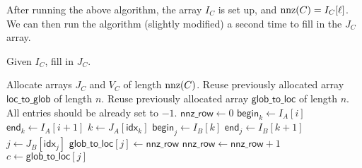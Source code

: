 \documentclass{lecture}
\begin{document}
After running the above algorithm, the array $I_C$ is set up, and $\operatorname{nnz}(C) = I_C[\ell]$.
We can then run the algorithm (slightly modified) a second time to fill in the $J_C$ array.
\begin{algorithm}[H]
   \caption{Given $I_C$, fill in $J_C$.}
   \begin{algorithmic}
      \State Allocate arrays $J_C$ and $V_C$ of length $\operatorname{nnz}(C)$.
      \State Reuse previously allocated array $\textsf{loc\_to\_glob}$ of length $n$.
      \State Reuse previously allocated array $\textsf{glob\_to\_loc}$ of length $n$. All entries should be already set to $-1$.
         \State $\textsf{nnz\_row} \gets 0$
         \State $\textsf{begin}_k \gets I_A[i]$
         \State $\textsf{end}_k \gets I_A[i+1]$
            \State $k \gets J_A[\textsf{idx}_k]$ 
%
            \State $\textsf{begin}_j \gets I_B[k]$
            \State $\textsf{end}_j \gets I_B[k+1]$
%
               \State $j \gets J_B[\textsf{idx}_j]$
                  \State $\textsf{glob\_to\_loc}[j] \gets \textsf{nnz\_row}$
                  \State $\textsf{nnz\_row} \gets \textsf{nnz\_row} + 1$
               \Else
                    \State $c \gets \textsf{glob\_to\_loc}[j]$
               \EndIf
            \EndFor
         \EndFor
      \EndFor
   \end{algorithmic}
\end{algorithm}
\end{document}
